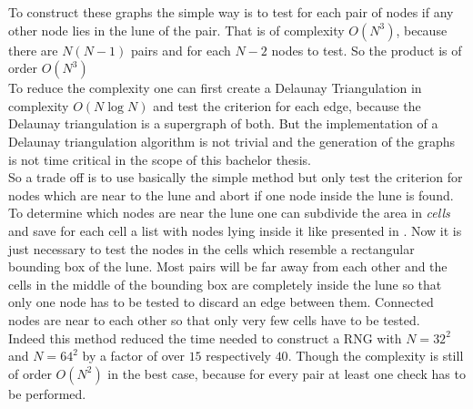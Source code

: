     To construct these graphs the simple way is to test for each
    pair of nodes if any other node lies in
    the lune of the pair. That is of complexity \(O (N^3)\), because
    there are \(N(N-1)\) pairs and for each \(N-2\) nodes to test. So
    the product is of order \(O(N^3)\)\\
    To reduce the complexity one can first create a Delaunay
    Triangulation in complexity \(O (N \log N)\)
    \cite{RNGCell} and test the criterion for each edge, because
    the Delaunay triangulation is a supergraph of both. But the
    implementation of a Delaunay triangulation algorithm is not trivial
    and the generation of the graphs is not time critical in the scope
    of this bachelor thesis.\\
    So a trade off is to use basically the simple method but only test
    the criterion for nodes which are near to the lune and abort if
    one node inside the lune is found. To determine which nodes are
    near the lune one can subdivide the area in \emph{cells} and save
    for each cell a list with nodes lying inside it like presented in
    \cite{RNGCell}.
    Now it is just necessary to test the nodes in the cells which
    resemble a rectangular bounding box of the lune. Most pairs will be
    far away from each other and the cells in the middle of the bounding
    box are completely inside the lune so that only one node has to be
    tested to discard an edge between them. Connected nodes are near to
    each other so that only very few cells have to be tested.\\
    Indeed this method reduced the time needed to construct a RNG with
    \(N=32^2\) and \(N=64^2\) by a factor of
    over \(15\) respectively \(40\). Though the complexity is still of
    order \(O(N^2)\) in the best case, because for every pair at least
    one check has to be performed.
